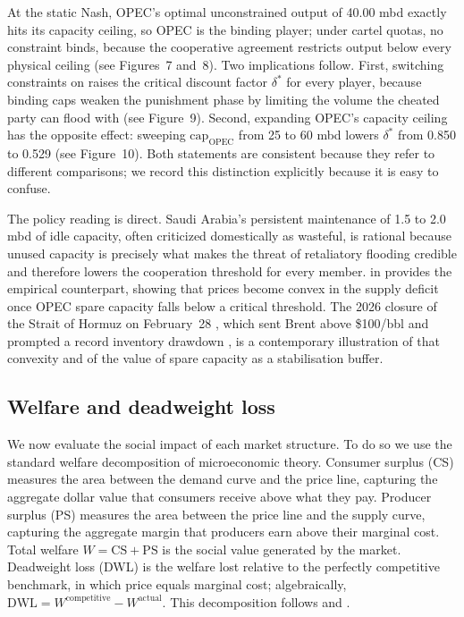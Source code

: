 At the static Nash, OPEC's optimal unconstrained output of 40.00 mbd
exactly hits its capacity ceiling, so OPEC is the binding player; under
cartel quotas, no constraint binds, because the cooperative agreement
restricts output below every physical ceiling (see Figures~7 and~8).
Two implications follow. First, switching constraints on raises the
critical discount factor $\delta^*$ for every player, because binding
caps weaken the punishment phase by limiting the volume the cheated
party can flood with (see Figure~9). Second, expanding OPEC's capacity
ceiling has the opposite effect: sweeping
$\mathrm{cap}_{\text{OPEC}}$ from 25 to 60 mbd lowers $\delta^*$ from
0.850 to 0.529 (see Figure~10). Both statements are consistent because
they refer to different comparisons; we record this distinction
explicitly because it is easy to confuse.

The policy reading is direct. Saudi Arabia's persistent maintenance of
1.5 to 2.0 mbd of idle capacity, often criticized domestically as
wasteful, is rational because unused capacity is precisely what makes
the threat of retaliatory flooding credible and therefore lowers the
cooperation threshold for every member. \citet{till2016} in 
provides the empirical counterpart, showing that prices become convex
in the supply deficit once OPEC spare capacity falls below a critical
threshold. The 2026 closure of the Strait of Hormuz on February~28
\citep{reuters2026}, which sent Brent above \$100/bbl and prompted a
record inventory drawdown \citep{iea2026omr}, is a contemporary
illustration of that convexity and of the value of spare capacity as a
stabilisation buffer.

\subsection{Welfare and deadweight loss}
\label{subsec:welfare}

We now evaluate the social impact of each market structure. To do so we
use the standard welfare decomposition of microeconomic theory. Consumer
surplus (CS) measures the area between the demand curve and the price
line, capturing the aggregate dollar value that consumers receive above
what they pay. Producer surplus (PS) measures the area between the
price line and the supply curve, capturing the aggregate margin that
producers earn above their marginal cost. Total welfare
$W = \mathrm{CS} + \mathrm{PS}$ is the social value generated by the
market. Deadweight loss (DWL) is the welfare lost relative to the
perfectly competitive benchmark, in which price equals marginal cost;
algebraically, $\mathrm{DWL} = W^{\text{competitive}} - W^{\text{actual}}$.
This decomposition follows \citet[p.~??]{mwg1995} and \citet[p.~??]{tirole1988}.

